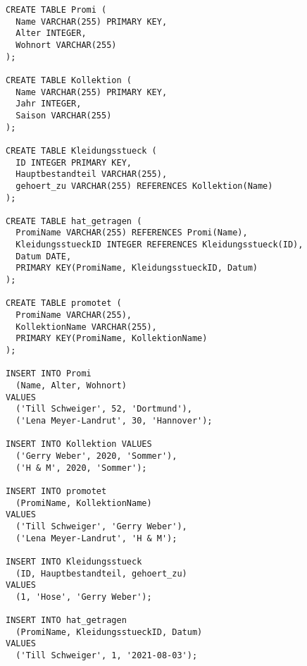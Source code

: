 \documentclass{bschlangaul-aufgabe}
\begin{document}
\begin{verbatim}
CREATE TABLE Promi (
  Name VARCHAR(255) PRIMARY KEY,
  Alter INTEGER,
  Wohnort VARCHAR(255)
);

CREATE TABLE Kollektion (
  Name VARCHAR(255) PRIMARY KEY,
  Jahr INTEGER,
  Saison VARCHAR(255)
);

CREATE TABLE Kleidungsstueck (
  ID INTEGER PRIMARY KEY,
  Hauptbestandteil VARCHAR(255),
  gehoert_zu VARCHAR(255) REFERENCES Kollektion(Name)
);

CREATE TABLE hat_getragen (
  PromiName VARCHAR(255) REFERENCES Promi(Name),
  KleidungsstueckID INTEGER REFERENCES Kleidungsstueck(ID),
  Datum DATE,
  PRIMARY KEY(PromiName, KleidungsstueckID, Datum)
);

CREATE TABLE promotet (
  PromiName VARCHAR(255),
  KollektionName VARCHAR(255),
  PRIMARY KEY(PromiName, KollektionName)
);

INSERT INTO Promi
  (Name, Alter, Wohnort)
VALUES
  ('Till Schweiger', 52, 'Dortmund'),
  ('Lena Meyer-Landrut', 30, 'Hannover');

INSERT INTO Kollektion VALUES
  ('Gerry Weber', 2020, 'Sommer'),
  ('H & M', 2020, 'Sommer');

INSERT INTO promotet
  (PromiName, KollektionName)
VALUES
  ('Till Schweiger', 'Gerry Weber'),
  ('Lena Meyer-Landrut', 'H & M');

INSERT INTO Kleidungsstueck
  (ID, Hauptbestandteil, gehoert_zu)
VALUES
  (1, 'Hose', 'Gerry Weber');

INSERT INTO hat_getragen
  (PromiName, KleidungsstueckID, Datum)
VALUES
  ('Till Schweiger', 1, '2021-08-03');
\end{verbatim}
\end{document}
